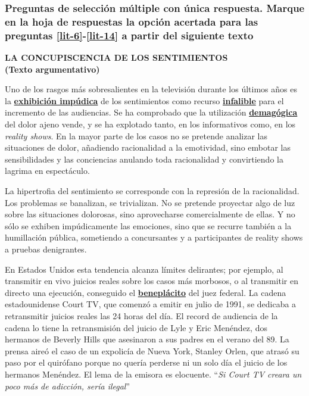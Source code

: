\begin{enumerate}
\subsubsection*{Preguntas de selección múltiple con única respuesta.  Marque en la hoja de respuestas la opción acertada para las preguntas \ref{lit-6}-\ref{lit-14} a partir del siguiente texto}

\begin{center}
\textbf{LA CONCUPISCENCIA DE LOS SENTIMIENTOS\\
(Texto argumentativo)}
\end{center}


Uno de los rasgos más sobresalientes en la televisión durante los últimos años es la \textbf{\underline{exhibición impúdica}} de los sentimientos como recurso \textbf{\underline{infalible}} para el incremento de las audiencias. Se ha comprobado que la utilización \textbf{\underline{demagógica }} del dolor ajeno vende, y se ha explotado tanto, en los informativos como, en los \textit{reality shows}. En la mayor parte de los casos no se pretende analizar las situaciones de dolor, añadiendo racionalidad a la emotividad, sino embotar las sensibilidades y las conciencias anulando toda racionalidad y convirtiendo la lagrima en espectáculo.

La hipertrofia del sentimiento se corresponde con la represión de la racionalidad.  Los problemas se banalizan, se trivializan. No se pretende proyectar algo de luz sobre las situaciones dolorosas, sino aprovecharse comercialmente de ellas. Y no sólo se exhiben impúdicamente las emociones, sino que se recurre también a la humillación pública, sometiendo a concursantes y a participantes de reality shows a pruebas denigrantes.

En Estados Unidos esta tendencia alcanza límites delirantes; por ejemplo, al transmitir en vivo juicios reales sobre los casos más morbosos, o al transmitir en directo una ejecución, conseguido el \textbf{\underline{beneplácito}} del juez federal. La cadena estadounidense Court TV, que comenzó a emitir en julio de 1991, se dedicaba a retransmitir juicios reales las 24 horas del día.  El record de audiencia de la cadena lo tiene la retransmisión del juicio de Lyle y Eric Menéndez, dos hermanos de Beverly Hills que asesinaron a sus padres en el verano del 89. La prensa aireó el caso de un expolicía de Nueva York, Stanley Orlen, que atrasó su paso por el quirófano porque no quería perderse ni un solo día el juicio de los hermanos Menéndez. El lema de la emisora es elocuente. ``\textit{Si Court TV creara un poco más de adicción, sería ilegal}''


\end{enumerate}

